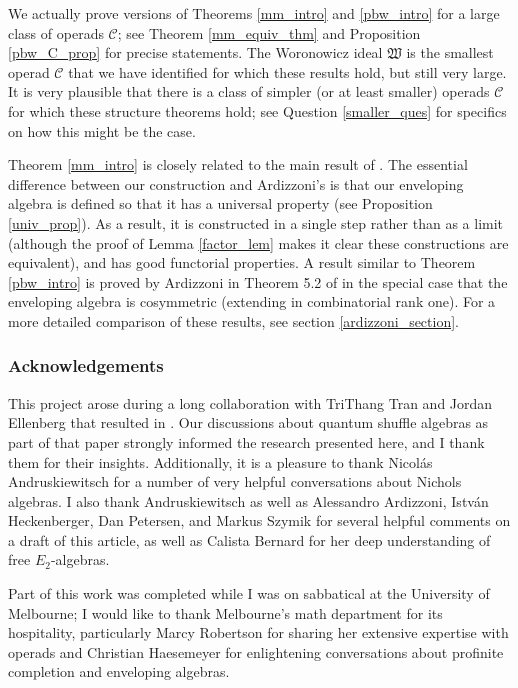 \documentclass[12pt]{article}
\newcommand{\CC} {\mathcal{C}}
\newcommand{\mW}{\mathfrak{W}}
\theoremstyle{plain}
\theoremstyle{definition}
\theoremstyle{remark}
\begin{document}
We actually prove versions of Theorems \ref{mm_intro} and \ref{pbw_intro} for a large class of operads $\CC$; see Theorem \ref{mm_equiv_thm} and Proposition \ref{pbw_C_prop} for precise statements.  The Woronowicz ideal $\mW$ is the smallest operad $\CC$ that we have identified for which these results hold, but still very large.  It is very plausible that there is a class of simpler (or at least smaller) operads $\CC$ for which these structure theorems hold; see Question \ref{smaller_ques} for specifics on how this might be the case. 

Theorem \ref{mm_intro} is closely related to the main result of \cite{ardizzoni_mm}.  The essential difference between our construction and Ardizzoni's is that our enveloping algebra is defined so that it has a universal property (see Proposition \ref{univ_prop}).  As a result, it is constructed in a single step rather than as a limit (although the proof of Lemma \ref{factor_lem} makes it clear these constructions are equivalent), and has good functorial properties.  A result similar to Theorem \ref{pbw_intro} is proved by Ardizzoni in Theorem 5.2 of \cite{ardizzoni_glasgow} in the special case that the enveloping algebra is cosymmetric (extending \cite{ardizzoni_prim_gen} in combinatorial rank one).  For a more detailed comparison of these results, see section \ref{ardizzoni_section}.  

\subsubsection*{Acknowledgements}

This project arose during a long collaboration with TriThang Tran and Jordan Ellenberg that resulted in \cite{etw}.  Our discussions about quantum shuffle algebras as part of that paper strongly informed the research presented here, and I thank them for their insights.  Additionally, it is a pleasure to thank Nicol\'{a}s Andruskiewitsch for a number of very helpful conversations about Nichols algebras.  I also thank Andruskiewitsch as well as Alessandro Ardizzoni, Istv\'an Heckenberger, Dan Petersen, and Markus Szymik for several helpful comments on a draft of this article, as well as Calista Bernard for her deep understanding of free $E_2$-algebras. 

Part of this work was completed while I was on sabbatical at the University of Melbourne; I would like to thank Melbourne's math department for its hospitality, particularly Marcy Robertson for sharing her extensive expertise with operads and Christian Haesemeyer for enlightening conversations about profinite completion and enveloping algebras.
\end{document}
